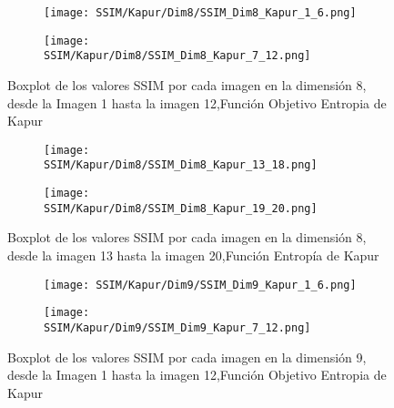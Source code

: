\documentclass[conference]{IEEEtran}
\begin{document}
\begin{figure}
	\centering
	
	\begin{subfigure}{0.5\textwidth}
		\texttt{[image: SSIM/Kapur/Dim8/SSIM\_Dim8\_Kapur\_1\_6.png]}
	\end{subfigure}
	
	\begin{subfigure}{0.5\textwidth}
		\texttt{[image: SSIM/Kapur/Dim8/SSIM\_Dim8\_Kapur\_7\_12.png]}
	\end{subfigure}
	\caption{Boxplot de los valores SSIM por cada imagen en la dimensión 8, desde la Imagen 1 hasta la imagen 12,Función Objetivo Entropia de Kapur}
	\label{fig:imagenes}    
\end{figure}

\begin{figure}
	\centering
	\begin{subfigure}{0.5\textwidth}
		\texttt{[image: SSIM/Kapur/Dim8/SSIM\_Dim8\_Kapur\_13\_18.png]}
	\end{subfigure}   
	\begin{subfigure}{0.5\textwidth}
		\texttt{[image: SSIM/Kapur/Dim8/SSIM\_Dim8\_Kapur\_19\_20.png]}
		\vspace{-150pt} %
	\end{subfigure}
	\caption{Boxplot de los valores SSIM por cada imagen en la dimensión 8, desde la imagen 13 hasta la imagen 20,Función Entropía de Kapur}
	\label{fig:imagenes}    
\end{figure}

\begin{figure}
	\centering
	
	\begin{subfigure}{0.5\textwidth}
		\texttt{[image: SSIM/Kapur/Dim9/SSIM\_Dim9\_Kapur\_1\_6.png]}
	\end{subfigure}
	
	\begin{subfigure}{0.5\textwidth}
		\texttt{[image: SSIM/Kapur/Dim9/SSIM\_Dim9\_Kapur\_7\_12.png]}
	\end{subfigure}
	\caption{Boxplot de los valores SSIM por cada imagen en la dimensión 9, desde la Imagen 1 hasta la imagen 12,Función Objetivo Entropia de Kapur}
	\label{fig:imagenes}    
\end{figure}
\end{document}
